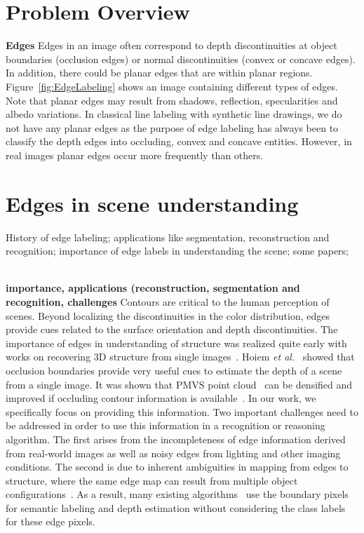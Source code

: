 \section{Problem Overview}

\textbf{Edges}
Edges in an image often correspond to depth discontinuities at object boundaries (occlusion 
edges) or normal discontinuities (convex or concave edges). In addition, there could be 
planar edges that are within planar regions. Figure~\ref{fig:EdgeLabeling} shows an image 
containing different types of edges. Note that planar edges may result from shadows, reflection, 
specularities and albedo variations. In classical line labeling with synthetic line 
drawings, we do not have any planar edges as the purpose of edge labeling has always been to 
classify the depth edges into occluding, convex and concave entities. However, in real images planar 
edges occur more frequently than others. 
\section{Edges in scene understanding} 
\label{sec:SECTION1NAME}

History of edge labeling; applications like segmentation, reconstruction and recognition; importance of edge labels in understanding the scene; some papers; \\
~\cite{3dFromSingleView}

\textbf{importance, applications (reconstruction, segmentation and recognition, challenges}
Contours are critical to the human perception of scenes. Beyond localizing the discontinuities 
in the color distribution, edges provide cues related to the surface orientation and depth 
discontinuities. The importance of edges in understanding of structure was realized quite 
early with works on recovering 3D structure from single 
 images~\cite{malik1989recovering,kanade1981recovery}. Hoiem \textit{et al.}~\cite{hoiem-ROB} showed that occlusion boundaries provide very useful cues to estimate the depth of a scene from a single image. It was shown that PMVS 
point cloud~\cite{furukawa-PAMI10} can be densified and improved if occluding contour information 
is available~\cite{qishan2014Occluding}. In our work, we specifically focus on providing this
information. Two important challenges need to be addressed in order to use this information in a 
recognition or reasoning algorithm. The first arises from the incompleteness of edge information 
derived from real-world images as well as noisy edges from lighting and other imaging conditions. 
The second is due to inherent ambiguities in mapping from edges to structure, where the same 
edge map can result from multiple object configurations~\cite{mild-sugihara}. As a result, many existing 
algorithms~\cite{gcontext-hoiem,hedau2012,schwing2012b,Lifting3DManhattan,lee2010} use the boundary 
pixels for semantic labeling and depth estimation without considering the class labels for these edge pixels. 


